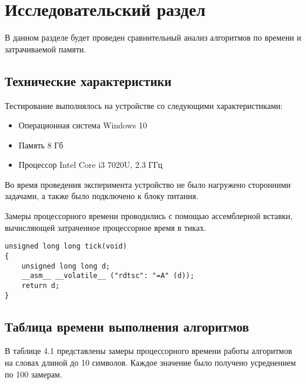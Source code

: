 \chapter{Исследовательский раздел}\label{sec:exp}

В данном разделе будет проведен сравнительный анализ алгоритмов по времени и затрачиваемой памяти.

\section{Технические характеристики}

Тестирование выполнялось на устройстве со следующими характеристиками: 

\begin{itemize}
	\item Операционная система Windows 10
	\item Память 8 Гб
	\item Процессор Intel Core i3 7020U, 2.3 ГГц
\end{itemize}

Во время проведения эксперимента устройство не было нагружено сторонними задачами, а также было подключено к блоку питания.

Замеры процессорного времени проводились с помощью ассемблерной вставки, вычисляющей затраченное процессорное время в тиках.

\begin{lstlisting}[label=tick, caption=Ассемблерная вставка замера процессорного времени в тиках]
unsigned long long tick(void)
{
    unsigned long long d;
    __asm__ __volatile__ ("rdtsc": "=A" (d));
    return d;
}
\end{lstlisting}

\section{Таблица времени выполнения алгоритмов}

В таблице 4.1 представлены замеры процессорного времени работы алгоритмов на словах длиной до 10 символов. Каждое значение было получено усреднением по 100 замерам.

